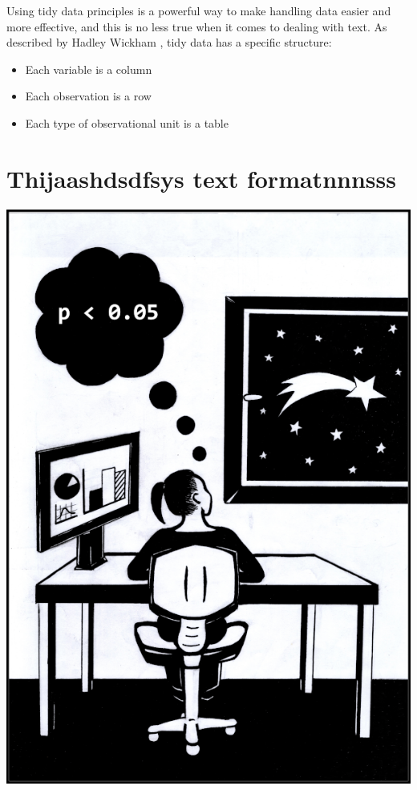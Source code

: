 \documentclass[
]{book}
\providecommand{\tightlist}{%
  \setlength{\itemsep}{0pt}\setlength{\parskip}{0pt}}
\begin{document}
Using tidy data principles is a powerful way to make handling data easier and more effective, and this is no less true when it comes to dealing with text. As described by Hadley Wickham \citep{tidydata}, tidy data has a specific structure:

\begin{itemize}
\tightlist
\item
  Each variable is a column
\item
  Each observation is a row
\item
  Each type of observational unit is a table
\end{itemize}

\hypertarget{thijaashdsdfsys-text-formatnnnsss}{%
\chapter{Thijaashdsdfsys text formatnnnsss}\label{thijaashdsdfsys-text-formatnnnsss}}

\begin{center}\includegraphics[width=0.9\linewidth]{images/ch_10_small} \end{center}
\end{document}

